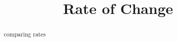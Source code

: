 \documentclass{ximera}
\title{Rate of Change}
\begin{document}
\begin{abstract}
comparing rates
\end{abstract}
\maketitle
\end{document}
